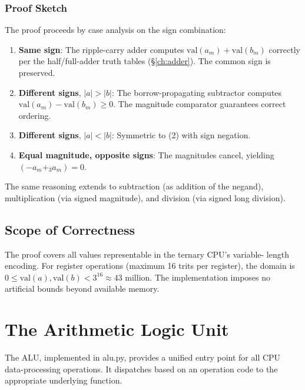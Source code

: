 \documentclass[12pt,a4paper,twoside]{book}
\theoremstyle{trinarytheorem}
\theoremstyle{trinarydefinition}
\newcommand{\code}[1]{\textsf{#1}}
\begin{document}
\subsection{Proof Sketch}

The proof proceeds by case analysis on the sign combination:

\begin{enumerate}
    \item \textbf{Same sign}: The ripple-carry adder computes
          $\text{val}(a_m) + \text{val}(b_m)$ correctly per
          the half/full-adder truth tables (\S\ref{ch:adder}).
          The common sign is preserved.
    \item \textbf{Different signs}, $|a| > |b|$: The borrow-propagating
          subtractor computes $\text{val}(a_m) - \text{val}(b_m) \geq 0$.
          The magnitude comparator guarantees correct ordering.
    \item \textbf{Different signs}, $|a| < |b|$: Symmetric to (2)
          with sign negation.
    \item \textbf{Equal magnitude, opposite signs}: The magnitudes
          cancel, yielding $(-a_m +_3 a_m) = 0$.
\end{enumerate}

\noindent The same reasoning extends to subtraction (as addition of the
negand), multiplication (via signed magnitude), and division (via
signed long division).

\section{Scope of Correctness}

The proof covers all values representable in the ternary CPU's variable-
length encoding. For register operations (maximum 16 trits per register),
the domain is $0 \leq \text{val}(a), \text{val}(b) < 3^{16} \approx 43$ million. The implementation
imposes no artificial bounds beyond available memory.

\chapter{The Arithmetic Logic Unit}
\label{ch:alu}

The ALU, implemented in \code{alu.py}, provides a unified entry point for all
CPU data-processing operations. It dispatches based on an operation code to the
appropriate underlying function.
\end{document}
